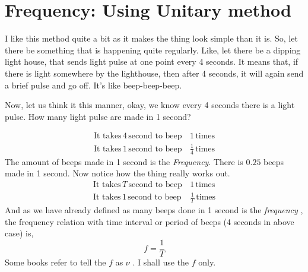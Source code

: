 \documentclass[a4paper]{article}
\begin{document}
\section{Frequency: Using Unitary method}
I like this method quite a bit as it makes the thing look simple than it is. So, let there be something that is happening quite regularly. Like, 
let there be a dipping light house, that sends light pulse at one point every 4 seconds. It means that, if there is light somewhere by the lighthouse,
then after 4 seconds, it will again send a brief pulse and go off. It's like beep-beep-beep.  

Now, let us think it this manner, okay, we know every 4 seconds there is a light pulse. How many light pulse are made in 1 second?

\begin{align*}
     \text{It takes}\, 4  \,\text{second to beep}\, &1 \, \text{times} \\
     \text{It takes}\, 1 \,\text{second to beep}\,  &\frac{1}{4}\,\text{times} 
\end{align*} 
The amount of beeps made in 1 second is the \emph{Frequency}. There is $0.25$ beeps made in 1 second. 
Now notice how the thing really works out. 
\begin{align*}
    \text{It takes}\, T  \,\text{second to beep}\, &1 \, \text{times} \\
    \text{It takes}\, 1 \,\text{second to beep}\,  &\frac{1}{T}\,\text{times} 
\end{align*} 
And as we have already defined as many beeps done in 1 second is the \emph{frequency }, the frequency relation with time interval 
or period of beeps (4 seconds in above case) is, 
\begin{equation}
    f = \frac{1}{T} 
\end{equation} 
Some books refer to tell the $f$  as $\nu$  . I shall use the $f$  only. 
\end{document}
